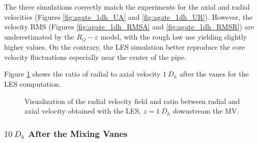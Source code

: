 \npar


The three simulations correctly match the experiments for the axial and radial velocities (Figures \ref{fig:agate_1dh_UA} and \ref{fig:agate_1dh_UR}). However, the velocity RMS (Figures \ref{fig:agate_1dh_RMSA} and \ref{fig:agate_1dh_RMSR}) are underestimated by the $R_{ij}-\varepsilon$ model, with the rough law use yielding slightly higher values. On the contrary, the LES simulation better reproduce the core velocity fluctuations especially near the center of the pipe.


\npar

Figure \ref{fig:ur_s_ua_1dh} shows the ratio of radial to axial velocity $1~D_{h}$ after the vanes for the LES computation.

\begin{figure}
\caption{Visualization of the radial velocity field and ratio between radial and axial velocity obtained with the LES, $z=1~D_{h}$ downstream the MV.}
\label{fig:ur_s_ua_1dh}
\end{figure}



\npar


\subsubsection{$10\ D_{h}$ After the Mixing Vanes}

